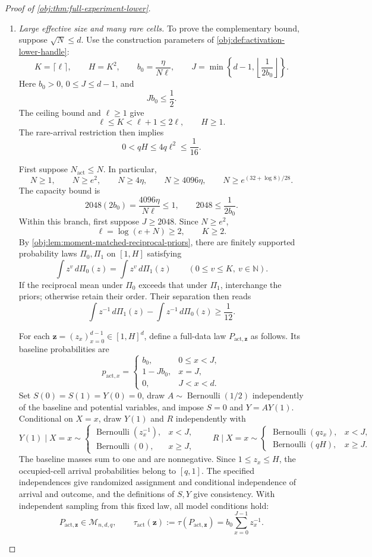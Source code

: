 \documentclass[11pt]{article}
\begin{document}
\begin{proof}[Proof of \cref{obj:thm:full-experiment-lower}]
\begin{enumerate}
\item \emph{Large effective size and many rare cells.}
To prove the complementary bound, suppose \(\sqrt N\le d\).
Use the construction parameters of
\cref{obj:def:activation-lower-handle}:
\[
K=\lceil\ell\rceil,\qquad H=K^2,\qquad
b_0=\frac{\eta}{N\ell},\qquad
J=\min\left\{d-1,\left\lfloor\frac1{2b_0}\right\rfloor\right\}.
\]
Here \(b_0>0\), \(0\le J\le d-1\), and
\[
Jb_0\le\frac12.
\]
The ceiling bound and \(\ell\ge1\) give
\[
\ell\le K<\ell+1\le2\ell,\qquad H\ge1.
\]
The rare-arrival restriction then implies
\[
0<qH\le4q\ell^2\le\frac1{16}.
\]

First suppose \(N_{\mathrm{act}}\le N\). In particular,
\[
N\ge1,\qquad N\ge e^2,\qquad
N\ge4\eta,\qquad N\ge4096\eta,\qquad
N\ge e^{(32+\log8)/28}.
\]
The capacity bound is
\[
2048(2b_0)=\frac{4096\eta}{N\ell}\le1,
\qquad
2048\le\frac1{2b_0}.
\]
Within this branch, first suppose \(J\ge2048\). Since \(N\ge e^2\),
\[
\ell=\log(e+N)\ge2,\qquad K\ge2.
\]
By \cref{obj:lem:moment-matched-reciprocal-priors}, there are finitely
supported probability laws \(\Pi_0,\Pi_1\) on \([1,H]\) satisfying
\[
\int z^v\,d\Pi_0(z)=\int z^v\,d\Pi_1(z)
\qquad(0\le v\le K,\ v\in\mathbb N).
\]
If the reciprocal mean under \(\Pi_0\) exceeds that under \(\Pi_1\), interchange
the priors; otherwise retain their order. Their separation then reads
\[
\int z^{-1}\,d\Pi_1(z)-\int z^{-1}\,d\Pi_0(z)
\ge\frac1{12}.
\]

For each \(\mathbf z=(z_x)_{x=0}^{d-1}\in[1,H]^d\), define a full-data law
\(P_{\mathrm{act},\mathbf z}\) as follows. Its baseline probabilities are
\[
p_{\mathrm{act},x}=
\begin{cases}
b_0,&0\le x<J,\\
1-Jb_0,&x=J,\\
0,&J<x<d.
\end{cases}
\]
Set \(S(0)=S(1)=Y(0)=0\), draw \(A\sim\operatorname{Bernoulli}(1/2)\)
independently of the baseline and potential variables, and impose \(S=0\) and
\(Y=AY(1)\). Conditional on \(X=x\), draw \(Y(1)\) and \(R\) independently with
\[
Y(1)\mid X=x\sim
\begin{cases}
\operatorname{Bernoulli}(z_x^{-1}),&x<J,\\
\operatorname{Bernoulli}(0),&x\ge J,
\end{cases}
\qquad
R\mid X=x\sim
\begin{cases}
\operatorname{Bernoulli}(qz_x),&x<J,\\
\operatorname{Bernoulli}(qH),&x\ge J.
\end{cases}
\]
The baseline masses sum to one and are nonnegative. Since \(1\le z_x\le H\),
the occupied-cell arrival probabilities belong to \([q,1]\). The specified
independences give randomized assignment and conditional independence of
arrival and outcome, and the definitions of \(S,Y\) give consistency.
With independent sampling from this fixed law, all model conditions hold:
\[
P_{\mathrm{act},\mathbf z}\in\mathcal M_{n,d,q},
\qquad
\tau_{\mathrm{act}}(\mathbf z)
:=\tau(P_{\mathrm{act},\mathbf z})
=b_0\sum_{x=0}^{J-1}z_x^{-1}.
\]


\end{enumerate}
\end{proof}
\end{document}

